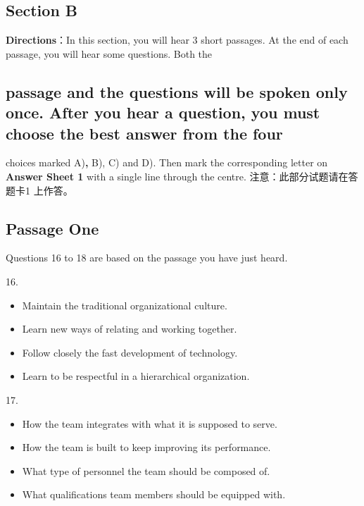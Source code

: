 \documentclass[UTF8,11pt]{ctexart}
\begin{document}
\subsection*{\textbf{Section B}}


\textbf{Directions}：In this section, you will hear 3 short passages. At the end of each passage, you will hear some questions. Both the


\subsection*{passage and the questions will be spoken only once. After you hear a question\textbf{,} you must choose the best answer from the four}


choices marked A)\textbf{,} B), C) and D). Then mark the corresponding letter on\textbf{ Answer Sheet 1} with a single line through the centre. 注意：此部分试题请在答题卡1 上作答。


\subsection*{Passage One}


Questions 16 to 18 are based on the passage you have just heard.


16.


\begin{itemize}[leftmargin=2em,itemsep=.2em,topsep=.4em]\item[A.] Maintain the traditional organizational culture.
\item[B.] Learn new ways of relating and working together.
\item[C.] Follow closely the fast development of technology.
\item[D.] Learn to be respectful in a hierarchical organization.
\end{itemize}

17.


\begin{itemize}[leftmargin=2em,itemsep=.2em,topsep=.4em]\item[A.] How the team integrates with what it is supposed to serve.
\item[B.] How the team is built to keep improving its performance.
\item[C.] What type of personnel the team should be composed of.
\item[D.] What qualifications team members should be equipped with.
\end{itemize}
\end{document}

